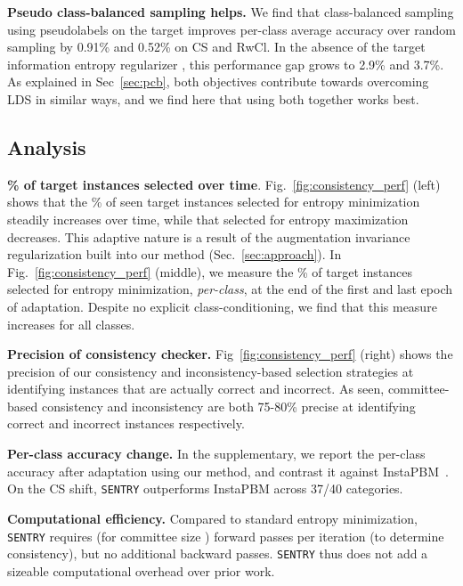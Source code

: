 \documentclass[10pt,twocolumn,letterpaper]{article}
\newcommand{\method}{\texttt{SENTRY}\xspace}
\begin{document}
\noindent \textbf{Pseudo class-balanced sampling helps.} We find that class-balanced sampling using pseudolabels on the target improves per-class average accuracy over random sampling by 0.91\% and 0.52\% on CS and RwCl. In the absence of the target information entropy regularizer , this performance gap grows to 2.9\% and 3.7\%.
As explained in Sec~\ref{sec:pcb}, both objectives contribute towards overcoming LDS in similar ways, and we find here that using both together works best.

\vspace{-5pt}
\subsection{Analysis}
\label{ref:analysis}
\vspace{-2pt}



\par\noindent \textbf{\% of target instances selected over time}. Fig.~\ref{fig:consistency_perf} (left) shows that the \% of seen target instances selected for entropy minimization steadily increases over time, while that selected for entropy maximization decreases. This adaptive nature is a result of the augmentation invariance regularization built into our method (Sec.~\ref{sec:approach}). In Fig.~\ref{fig:consistency_perf} (middle), we measure the \% of target instances selected for entropy minimization, \emph{per-class}, at the end of the first and last epoch of adaptation. Despite no explicit class-conditioning, we find that this measure increases for all classes.



\par\noindent \textbf{Precision of consistency checker.} Fig~\ref{fig:consistency_perf} (right) shows the precision of our consistency and inconsistency-based selection strategies at identifying instances that are actually correct and incorrect. As seen, committee-based consistency and inconsistency are both 75-80\% precise at identifying correct and incorrect instances respectively.


\par\noindent \textbf{Per-class accuracy change.} In the supplementary, we report the per-class accuracy after adaptation using our method, and contrast it against InstaPBM~\cite{li2020rethinking}. On the CS shift, \method outperforms InstaPBM across 37/40 categories. 


\par\noindent \textbf{Computational efficiency.} Compared to standard entropy minimization, \method requires  (for committee size ) forward passes per iteration (to determine consistency), but no additional backward passes. \method thus does not add a sizeable computational overhead over prior work.
\end{document}
